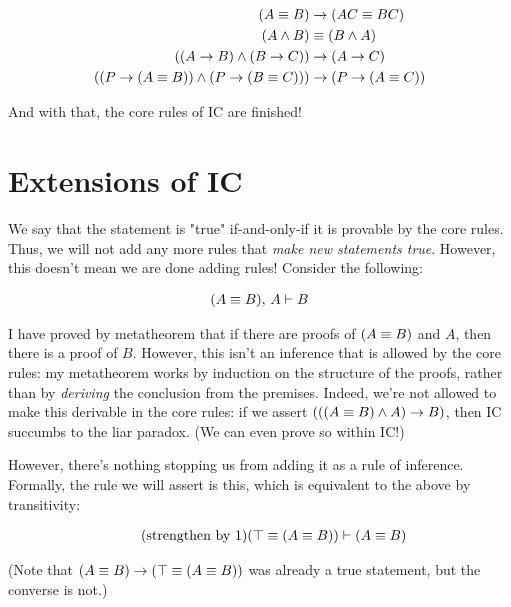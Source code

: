 \documentclass{article}
\begin{document}
  \begin{align*}
    (A \equiv B) &\to (AC \equiv BC)\\
    (A \wedge B) &\equiv (B \wedge A)\\
    ((A \to B) \wedge (B \to C)) &\to (A \to C)\\
    ((P \to (A \equiv B)) \wedge (P \to (B \equiv C))) &\to (P \to (A \equiv C))\\
  \end{align*}
  
  And with that, the core rules of IC are finished!
  
  \section{Extensions of IC}
  
  We say that the statement is "true" if-and-only-if it is provable by the core rules. Thus, we will not add any more rules that \emph{make new statements true}. However, this doesn't mean we are done adding rules! Consider the following:
  
  \begin{align*}
    (A \equiv B) ,\, A &\vdash B \\
  \end{align*}
  
  I have proved by metatheorem that if there are proofs of $(A \equiv B)$ and $A$, then there is a proof of $B$. However, this isn't an inference that is allowed by the core rules: my metatheorem works by induction on the structure of the proofs, rather than by \emph{deriving} the conclusion from the premises. Indeed, we're not allowed to make this derivable in the core rules: if we assert $(((A \equiv B) \wedge A) \to B)$, then IC succumbs to the liar paradox. (We can even prove so within IC!)
  
  However, there's nothing stopping us from adding it as a rule of inference. Formally, the rule we will assert is this, which is equivalent to the above by transitivity:
  
  \begin{align*}
    \tag{strengthen by 1}\label{strengthening_1}
    (\top \equiv (A \equiv B)) &\vdash (A \equiv B) \\
  \end{align*}
  
  (Note that $(A \equiv B) \to (\top \equiv (A \equiv B))$ was already a true statement, but the converse is not.)
  
\end{document}
